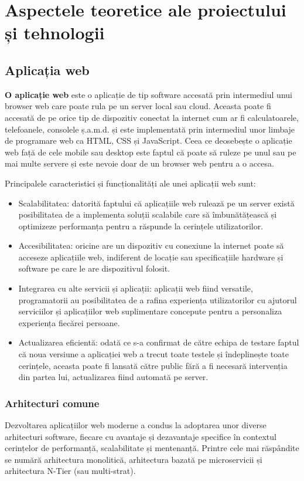 \documentclass[12pt, a4paper, oneside, romanian]{teza-upb}
\begin{document}
	\chapter{Aspectele teoretice ale proiectului și tehnologii}
	
	\section {Aplicația web}
	
	\textbf{O aplicație web} \cite{web} este o aplicație de tip software accesată prin intermediul unui browser web care poate rula pe un server local sau cloud. Aceasta poate fi accesată de pe orice tip de dispozitiv conectat la internet cum ar fi calculatoarele, telefoanele, consolele ș.a.m.d. și este implementată prin intermediul unor limbaje de programare web ca HTML, CSS și JavaScript. Ceea ce deosebește o aplicație web față de cele mobile sau desktop este faptul că poate să ruleze pe unul sau pe mai multe servere și este nevoie doar de un browser web pentru a o accesa. 
	
	Principalele caracteristici și funcționalități ale unei aplicații web sunt:
	\begin{itemize}
		\item Scalabilitatea: datorită faptului că aplicațiile web rulează pe un server există posibilitatea de a implementa soluții scalabile care să îmbunătățească și optimizeze performanța pentru a răspunde la cerințele utilizatorilor.
		\item Accesibilitatea: oricine are un dispozitiv cu conexiune la internet poate să acceseze aplicațiile web, indiferent de locație sau specificațiile hardware și software pe care le are dispozitivul folosit.
		\item Integrarea cu alte servicii și aplicații: aplicații web fiind versatile, programatorii au posibilitatea de a rafina experiența utilizatorilor cu ajutorul serviciilor și aplicațiilor web suplimentare concepute pentru a personaliza experiența fiecărei persoane.
		\item Actualizarea eficientă: odată ce s-a confirmat de către echipa de testare faptul că noua versiune a aplicației web a trecut toate testele și îndeplinește toate cerințele, aceasta poate fi lansată către public fără a fi necesară intervenția din partea lui, actualizarea fiind automată pe server.
	\end{itemize}
	
	
	
	\subsection{Arhitecturi comune}
	Dezvoltarea aplicațiilor web moderne a condus la adoptarea unor diverse arhitecturi software, fiecare cu avantaje și dezavantaje specifice în contextul cerințelor de performanță, scalabilitate și mentenanță. Printre cele mai răspândite se numără arhitectura monolitică, arhitectura bazată pe microservicii și arhitectura N-Tier (sau multi-strat).
	
\end{document}
